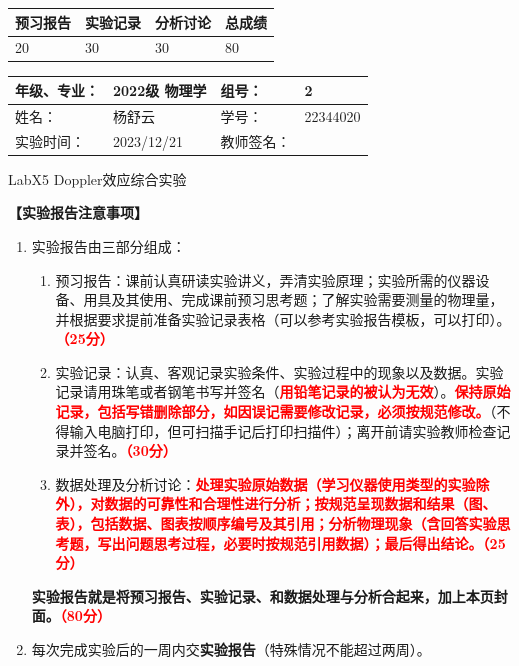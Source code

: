 \documentclass[dvipsnames, svgnames,a4paper,11pt]{article}
\begin{document}
	
	
	
	\begin{table}
		\renewcommand\arraystretch{1.7}
		\begin{tabularx}{\textwidth}{
				|X|X|X|X
				|X|X|X|X|}
			\hline
			\multicolumn{2}{|c|}{预习报告}&\multicolumn{2}{|c|}{实验记录}&\multicolumn{2}{|c|}{分析讨论}&\multicolumn{2}{|c|}{总成绩}\\
			\hline
			\LARGE20 & & \LARGE30 & & \LARGE30 & & \LARGE80 & \\
			\hline
		\end{tabularx}
	\end{table}
	
	\begin{table}
		\renewcommand\arraystretch{1.7}
		\begin{tabularx}{\textwidth}{|X|X|X|X|}
			\hline
			年级、专业： & 2022级 物理学 &组号： & 2\\
			\hline
			姓名： & 杨舒云  & 学号： & 22344020\\
			\hline
			实验时间： & 2023/12/21 & 教师签名： & \\
			\hline
		\end{tabularx}
	\end{table}
	
	\begin{center}
		\LARGE LabX5 \quad Doppler效应综合实验
	\end{center}
	
	\textbf{【实验报告注意事项】}
	\begin{enumerate}
		\item 实验报告由三部分组成：
		\begin{enumerate}
			\item 预习报告：课前认真研读实验讲义，弄清实验原理；实验所需的仪器设备、用具及其使用、完成课前预习思考题；了解实验需要测量的物理量，并根据要求提前准备实验记录表格（可以参考实验报告模板，可以打印）。\textcolor{red}{\textbf{（25分）}}
			\item 实验记录：认真、客观记录实验条件、实验过程中的现象以及数据。实验记录请用珠笔或者钢笔书写并签名（\textcolor{red}{\textbf{用铅笔记录的被认为无效}}）。\textcolor{red}{\textbf{保持原始记录，包括写错删除部分，如因误记需要修改记录，必须按规范修改。}}（不得输入电脑打印，但可扫描手记后打印扫描件）；离开前请实验教师检查记录并签名。\textcolor{red}{\textbf{（30分）}}
			\item 数据处理及分析讨论：\textcolor{red}{\textbf{处理实验原始数据（学习仪器使用类型的实验除外），对数据的可靠性和合理性进行分析；按规范呈现数据和结果（图、表），包括数据、图表按顺序编号及其引用；分析物理现象（含回答实验思考题，写出问题思考过程，必要时按规范引用数据）；最后得出结论。}}\textcolor{red}{\textbf{（25分）}}
		\end{enumerate}
		\textbf{实验报告就是将预习报告、实验记录、和数据处理与分析合起来，加上本页封面。\textcolor{red}{（80分）}}
		\item 每次完成实验后的一周内交\textbf{实验报告}（特殊情况不能超过两周）。
	\end{enumerate}
	
\end{document}
